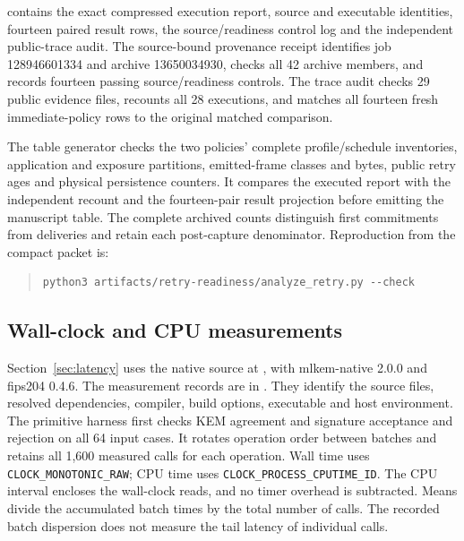  contains the exact compressed execution
report, source and executable identities, fourteen paired result rows, the
source/readiness control log and the independent public-trace audit. The
source-bound provenance receipt identifies job 128946601334 and archive
13650034930, checks all 42 archive members, and records fourteen passing
source/readiness controls. The trace audit checks 29 public evidence files,
recounts all 28 executions, and matches all fourteen fresh immediate-policy
rows to the original matched comparison.

The table generator checks the two policies' complete profile/schedule
inventories, application and exposure partitions, emitted-frame classes and
bytes, public retry ages and physical persistence counters. It compares the
executed report with the independent recount and the fourteen-pair result
projection before emitting the manuscript table. The complete archived
counts distinguish first commitments from deliveries and retain each
post-capture denominator. Reproduction from the compact packet is:
\begin{quote}
\small
\begin{verbatim}
python3 artifacts/retry-readiness/analyze_retry.py --check
\end{verbatim}
\end{quote}

\subsection{Wall-clock and CPU measurements}
\label{app:latency}

Section~\ref{sec:latency} uses the native source at
, with mlkem-native 2.0.0 and
fips204 0.4.6. The measurement records are in
. They identify the source files, resolved
dependencies, compiler, build options, executable and host environment.
The primitive harness first checks KEM agreement and signature acceptance
and rejection on all 64 input cases. It rotates operation order between
batches and retains all 1,600 measured calls for each operation.
Wall time uses \texttt{CLOCK\_MONOTONIC\_RAW}; CPU time uses
\texttt{CLOCK\_PROCESS\_CPUTIME\_ID}. The CPU interval encloses the wall-clock
reads, and no timer overhead is subtracted. Means divide the accumulated
batch times by the total number of calls. The recorded batch dispersion
does not measure the tail latency of individual calls.

